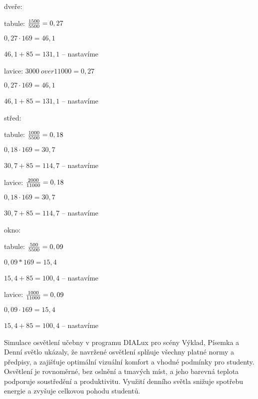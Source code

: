 {\sbf dveře:}

tabule: ${1500 \over 5500} = 0,27$

        ${0,27 \cdot 169} = 46,1$

        $46,1 + 85 = 131,1$ – nastavíme

lavice: ${3000 \ over 11000} = 0,27$

        ${0,27 \cdot 169} = 46,1$

        $46,1 + 85 = 131,1$ – nastavíme

{\sbf střed:}


tabule: ${1000 \over 5500} = 0,18$

        ${0,18 \cdot 169} = 30,7$

        $30,7 + 85 = 114,7$ – nastavíme

lavice: ${2000 \over 11000} = 0,18$

        ${0,18 \cdot 169} = 30,7$

        $30,7 + 85 = 114,7$ – nastavíme

{\sbf okno:}


tabule: ${500 \over 5500} = 0,09$

        ${0,09 * 169} = 15,4$

        $15,4 + 85 = 100,4$ – nastavíme

lavice: ${1000 \over 11000} = 0,09$

        ${0,09 \cdot 169} = 15,4$

        $15,4 + 85 = 100,4$ – nastavíme


Simulace osvětlení učebny v programu DIALux pro scény Výklad, Písemka a Denní světlo ukázaly, že navržené osvětlení
splňuje všechny platné normy a předpisy, a zajišťuje optimální vizuální komfort a vhodné podmínky pro studenty.
Osvětlení je rovnoměrné, bez oslnění a tmavých míst, a jeho barevná teplota podporuje soustředění a produktivitu.
Využití denního světla snižuje spotřebu energie a zvyšuje celkovou pohodu studentů.



